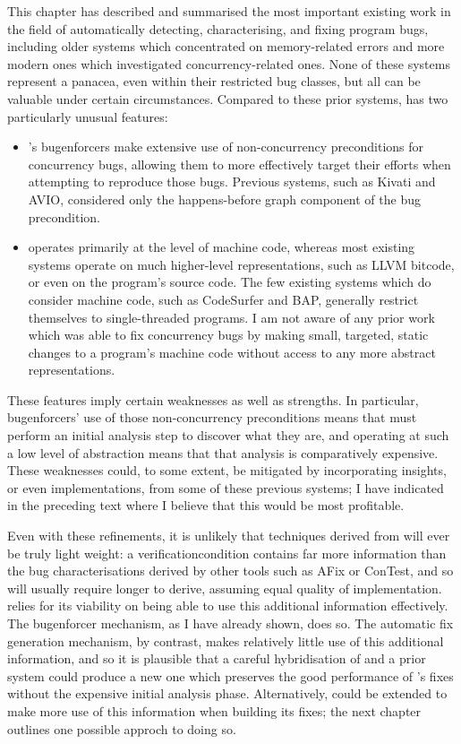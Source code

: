 This chapter has described and summarised the most important existing
work in the field of automatically detecting, characterising, and
fixing program bugs, including older systems which concentrated on
memory-related errors and more modern ones which investigated
concurrency-related ones.  None of these systems represent a panacea,
even within their restricted bug classes, but all can be valuable
under certain circumstances.  Compared to these prior systems,
{\technique} has two particularly unusual features:
\begin{itemize}
\item {\Technique}'s \glspl{bugenforcer} make extensive use of
  non-concurrency preconditions for concurrency bugs, allowing them to
  more effectively target their efforts when attempting to reproduce
  those bugs.  Previous systems, such as Kivati and AVIO, considered
  only the happens-before graph component of the bug precondition.
\item {\Technique} operates primarily at the level of machine code,
  whereas most existing systems operate on much higher-level
  representations, such as LLVM bitcode, or even on the program's
  source code.  The few existing systems which do consider machine
  code, such as CodeSurfer and BAP, generally restrict themselves to
  single-threaded programs.  I am not aware of any prior work which
  was able to fix concurrency bugs by making small, targeted, static
  changes to a program's machine code without access to any more
  abstract representations.
\end{itemize}
These features imply certain weaknesses as well as strengths.  In
particular, \glspl{bugenforcer}' use of those non-concurrency
preconditions means that {\technique} must perform an initial analysis
step to discover what they are, and operating at such a low level of
abstraction means that that analysis is comparatively expensive.
These weaknesses could, to some extent, be mitigated by incorporating
insights, or even implementations, from some of these previous
systems; I have indicated in the preceding text where I believe that
this would be most profitable.

Even with these refinements, it is unlikely that techniques derived
from {\technique} will ever be truly light weight: a {\technique}
\gls{verificationcondition} contains far more information than the bug
characterisations derived by other tools such as AFix or ConTest, and
so will usually require longer to derive, assuming equal quality of
implementation.  {\Technique} relies for its viability on being able
to use this additional information effectively.  The \gls{bugenforcer}
mechanism, as I have already shown, does so.  The automatic fix
generation mechanism, by contrast, makes relatively little use of this
additional information, and so it is plausible that a careful
hybridisation of {\technique} and a prior system could produce a new
one which preserves the good performance of {\technique}'s fixes
without the expensive initial analysis phase.  Alternatively,
{\technique} could be extended to make more use of this information
when building its fixes; the next chapter outlines one possible
approch to doing so.

